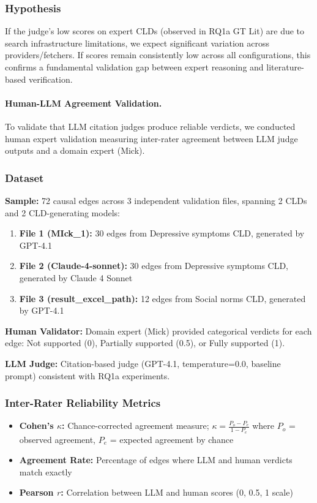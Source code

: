 \subsubsection{Hypothesis}

If the judge's low scores on expert CLDs (observed in RQ1a GT Lit) are due to search infrastructure limitations, we expect significant variation across providers/fetchers. If scores remain consistently low across all configurations, this confirms a fundamental validation gap between expert reasoning and literature-based verification.

\paragraph{Human-LLM Agreement Validation.}
To validate that LLM citation judges produce reliable verdicts, we conducted human expert validation measuring inter-rater agreement between LLM judge outputs and a domain expert (Mick).

\subsubsection{Dataset}

\textbf{Sample:} 72 causal edges across 3 independent validation files, spanning 2 CLDs and 2 CLD-generating models:
\begin{enumerate}[noitemsep]
    \item \textbf{File 1 (MIck\_1):} 30 edges from Depressive symptoms CLD, generated by GPT-4.1
    \item \textbf{File 2 (Claude-4-sonnet):} 30 edges from Depressive symptoms CLD, generated by Claude 4 Sonnet
    \item \textbf{File 3 (result\_excel\_path):} 12 edges from Social norms CLD, generated by GPT-4.1
\end{enumerate}

\textbf{Human Validator:} Domain expert (Mick) provided categorical verdicts for each edge: Not supported (0), Partially supported (0.5), or Fully supported (1).

\textbf{LLM Judge:} Citation-based judge (GPT-4.1, temperature=0.0, baseline prompt) consistent with RQ1a experiments.

\subsubsection{Inter-Rater Reliability Metrics}

\begin{itemize}[noitemsep]
    \item \textbf{Cohen's $\kappa$:} Chance-corrected agreement measure; $\kappa = \frac{P_o - P_e}{1 - P_e}$ where $P_o$ = observed agreement, $P_e$ = expected agreement by chance
    \item \textbf{Agreement Rate:} Percentage of edges where LLM and human verdicts match exactly
    \item \textbf{Pearson $r$:} Correlation between LLM and human scores (0, 0.5, 1 scale)
\end{itemize}

